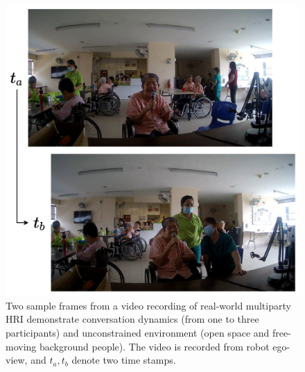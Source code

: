 \documentclass[VANCOUVER,STIX1COL]{WileyNJD-v2}
\begin{document}
\begin{figure}[t]
  \centering
  \includegraphics[width=0.72\linewidth]{assets/interaction_sample.drawio.pdf}
  \caption{Two sample frames from a video recording of real-world multiparty HRI demonstrate conversation dynamics (from one to three participants) and unconstrained environment (open space and free-moving background people). The video is recorded from robot ego-view, and $t_a, t_b$ denote two time stamps.}
  \label{f:interaction_sample}
\end{figure}
\end{document}
